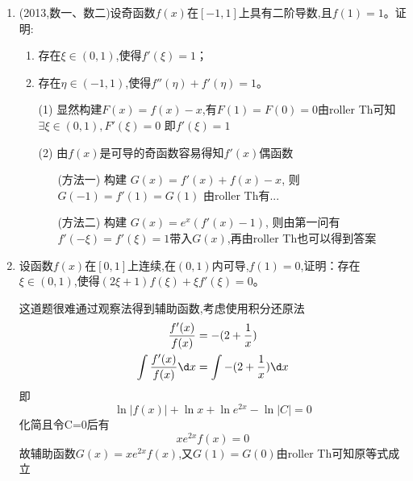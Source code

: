 \documentclass[12pt, a4paper, oneside, UTF8]{ctexbook}
\begin{document}
\begin{enumerate}[label=\arabic*.,start=25]
    \item  (2013,数一、数二)设奇函数$f(x)$在$[-1,1]$上具有二阶导数,且$f(1)=1$。证明:
    \begin{enumerate}[label=(\roman*)]
        \item 存在$\xi\in(0,1)$,使得$f'(\xi)=1$；
        \item 存在$\eta\in(-1,1)$,使得$f''(\eta)+f'(\eta)=1$。
    \end{enumerate}
    
    \begin{solution}
    \begin{enumerate}
        \item [(1)] 显然构建$F(x)=f(x)-x$,有$F(1)=F(0)=0$由roller Th可知$\exists\xi\in(0,1),F'(\xi)=0$
        即$f'(\xi)=1$ 

        \item [(2)] 由$f(x)$是可导的奇函数容易得知$f'(x)$偶函数 
        \begin{enumerate}
            \item [(方法一)] 构建 $G(x)=f'(x)+f(x)-x$, 则$G(-1)=f'(1)=G(1)$ 由roller Th有...
            \item [(方法二)] 构建 $G(x)=e^x(f'(x)-1)$, 则由第一问有$f'(-\xi)=f'(\xi)=1$带入$G(x)$,再由roller Th也可以得到答案
        \end{enumerate}
    \end{enumerate}
    \end{solution}
    
    \item  设函数$f(x)$在$[0,1]$上连续,在$(0,1)$内可导,$f(1)=0$,证明：存在$\xi\in(0,1)$,使得$(2\xi+1)f(\xi)+\xi f'(\xi)=0$。
    
    \begin{solution}
    这道题很难通过观察法得到辅助函数,考虑使用积分还原法 
    \begin{align*}
        \frac{f'(x)}{f(x)}  &= -(2+\frac{1}{x}) \\
        \int\frac{f'(x)}{f(x)}\d x &= \int -(2+\frac{1}{x})\d x \\
    \end{align*}
    即
    $$
    \ln{\left|f(x)\right|} +\ln{x}+\ln e^{2x}-\ln\left|C\right| = 0
    $$
    化简且令C=0后有 
    $$
    xe^{2x}f(x) = 0
    $$
    故辅助函数$G(x)=xe^{2x}f(x)$,又$G(1)=G(0)$由roller Th可知原等式成立
    \end{solution}
\end{enumerate}
\end{document}
